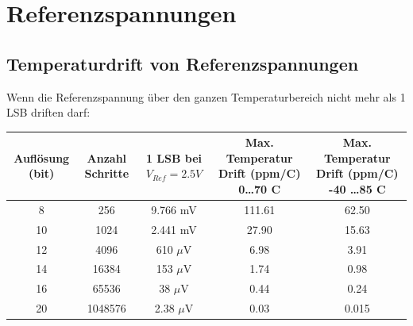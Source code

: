 \section{Referenzspannungen} 

\subsection{Temperaturdrift von Referenzspannungen}
Wenn die Referenzspannung über den ganzen Temperaturbereich nicht mehr als 1 LSB driften darf:

\begin{tabular}{|c|c|c|c|c|}
	\hline
	Auflösung (bit)	& 
	Anzahl Schritte	& 
	1 LSB bei $V_{Ref} = 2.5 V$	& 
	\multicolumn{1}{p{4cm}|}{Max. Temperatur Drift (ppm/\textdegree C) 0\ldots70 \textdegree C} &
	\multicolumn{1}{p{4cm}|}{Max. Temperatur Drift (ppm/\textdegree C) -40 \ldots 85 \textdegree C}
	\\ \hline
	8 	& 256	& 9.766 mV 		& 111.61	& 62.50
	\\ \hline
	10	& 1024	& 2.441 mV		& 27.90		& 15.63
	\\ \hline 
	12	& 4096	& 610 $\mu$V	& 6.98		& 3.91
	\\ \hline
	14	& 16384	& 153 $\mu$V	& 1.74		& 0.98
	\\ \hline
	16	& 65536	& 38 $\mu$V		& 0.44		& 0.24
	\\ \hline
	20	& 1048576	& 2.38 $\mu$V	& 0.03	& 0.015
	\\ \hline 
\end{tabular}

